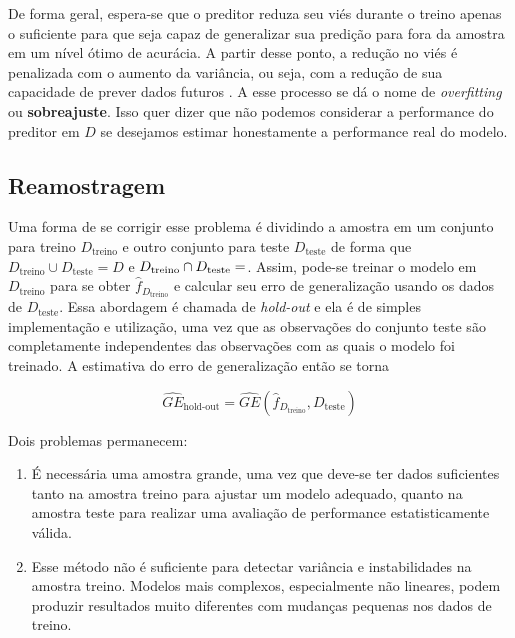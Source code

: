 \documentclass[
  12pt,
  oneside,
  a4paper,
  chapter=TITLE,
  section=TITLE,
  brazil]{abntex2}
\begin{document}
De forma geral, espera-se que o preditor reduza seu viés durante o
treino apenas o suficiente para que seja capaz de generalizar sua
predição para fora da amostra em um nível ótimo de acurácia. A partir
desse ponto, a redução no viés é penalizada com o aumento da variância,
ou seja, com a redução de sua capacidade de prever dados futuros
\autocite{bischl_resampling_2012}. A esse processo se dá o nome de
\emph{overfitting} ou \textbf{sobreajuste}. Isso quer dizer que não
podemos considerar a performance do preditor em \(D\) se desejamos
estimar honestamente a performance real do modelo.

\hypertarget{reamostragem}{%
\subsection{Reamostragem}\label{reamostragem}}

Uma forma de se corrigir esse problema é dividindo a amostra em um
conjunto para treino \(D_\text{treino}\) e outro conjunto para teste
\(D_\text{teste}\) de forma que
\(D_\text{treino} \cup D_\text{teste} = D\) e
\(D_\text{treino} \cap D_\text{teste} = \empty\). Assim, pode-se treinar
o modelo em \(D_\text{treino}\) para se obter
\(\hat{f}_{D_{\text{treino}}}\) e calcular seu erro de generalização
usando os dados de \(D_\text{teste}\). Essa abordagem é chamada de
\emph{hold-out} e ela é de simples implementação e utilização, uma vez
que as observações do conjunto teste são completamente independentes das
observações com as quais o modelo foi treinado. A estimativa do erro de
generalização então se torna

\[\widehat{GE}_\text{hold-out} = \widehat{GE}(\hat{f}_{D_{\text{treino}}}, D_{\text{teste}})\]

Dois problemas permanecem:

\begin{enumerate}
\def\labelenumi{\arabic{enumi}.}
\item
  É necessária uma amostra grande, uma vez que deve-se ter dados
  suficientes tanto na amostra treino para ajustar um modelo adequado,
  quanto na amostra teste para realizar uma avaliação de performance
  estatisticamente válida.
\item
  Esse método não é suficiente para detectar variância e instabilidades
  na amostra treino. Modelos mais complexos, especialmente não lineares,
  podem produzir resultados muito diferentes com mudanças pequenas nos
  dados de treino.
\end{enumerate}
\end{document}
